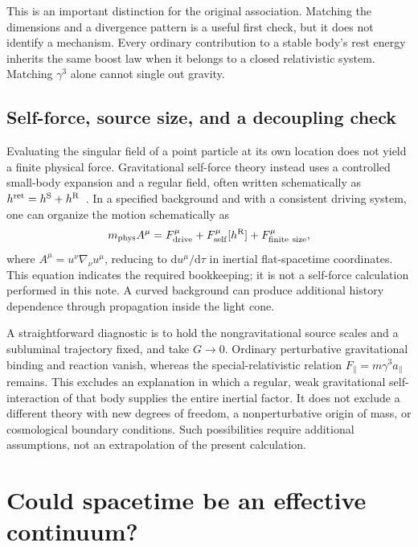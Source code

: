 \documentclass[11pt,a4paper]{article}
\numberwithin{equation}{section}
\newcommand{\dd}{\mathrm{d}}
\newcommand{\ret}{\mathrm{ret}}
\newcommand{\phys}{\mathrm{phys}}
\begin{document}
This is an important distinction for the original association. Matching the dimensions and a divergence pattern is a useful first check, but it does not identify a mechanism. Every ordinary contribution to a stable body's rest energy inherits the same boost law when it belongs to a closed relativistic system. Matching $\gamma^3$ alone cannot single out gravity.

\subsection{Self-force, source size, and a decoupling check}

Evaluating the singular field of a point particle at its own location does not yield a finite physical force. Gravitational self-force theory instead uses a controlled small-body expansion and a regular field, often written schematically as $h^{\ret}=h^{\rm S}+h^{\rm R}$~\cite{poisson}. In a specified background and with a consistent driving system, one can organize the motion schematically as
\begin{equation}
 m_\phys A^\mu=F_{\rm drive}^\mu+
 F_{\rm self}^\mu[h^{\rm R}]+F_{\rm finite\ size}^\mu,
 \label{eq:schematic-self-force}
\end{equation}
where $A^\mu=u^\nu\nabla_\nu u^\mu$, reducing to $\dd u^\mu/\dd\tau$ in inertial flat-spacetime coordinates. This equation indicates the required bookkeeping; it is not a self-force calculation performed in this note. A curved background can produce additional history dependence through propagation inside the light cone.

A straightforward diagnostic is to hold the nongravitational source scales and a subluminal trajectory fixed, and take $G\to0$. Ordinary perturbative gravitational binding and reaction vanish, whereas the special-relativistic relation $F_\parallel=m\gamma^3a_\parallel$ remains. This excludes an explanation in which a regular, weak gravitational self-interaction of that body supplies the entire inertial factor. It does not exclude a different theory with new degrees of freedom, a nonperturbative origin of mass, or cosmological boundary conditions. Such possibilities require additional assumptions, not an extrapolation of the present calculation.

\section{Could spacetime be an effective continuum?}
\label{sec:continuum}
\end{document}
